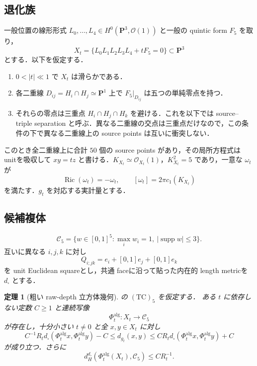 \documentclass[a4paper,11pt]{ltjsarticle}
\numberwithin{equation}{section}
\theoremstyle{plain}
\newtheorem{theorem}{定理}[section]
\theoremstyle{definition}
\theoremstyle{remark}
\newcommand{\PP}{\mathbf P}\newcommand{\CC}{\mathbf C}\newcommand{\RR}{\mathbf R}\newcommand{\ZZ}{\mathbf Z}\newcommand{\NN}{\mathbf N}
\newcommand{\supp}{\operatorname{supp}}\newcommand{\diam}{\operatorname{diam}}\newcommand{\dist}{\operatorname{dist}}
\newcommand{\Ric}{\operatorname{Ric}}\newcommand{\tr}{\operatorname{tr}}\newcommand{\osc}{\operatorname{osc}}\newcommand{\vol}{\operatorname{Vol}}
\newcommand{\Cfive}{\mathcal C_5}\newcommand{\dsq}{d_{\square}}\newcommand{\Lt}{L_t}\newcommand{\Rt}{R_t}
\begin{document}
\subsection{退化族}
一般位置の線形形式 $L_0,\ldots,L_4\in H^0(\PP^3,\mathcal O(1))$ と一般の quintic form $F_5$ を取り，
\begin{equation}\label{coarse:eq:family}
 X_t=\{L_0L_1L_2L_3L_4+tF_5=0\}\subset\PP^3
\end{equation}
とする．以下を仮定する．
\begin{enumerate}[label=\textup{(G\arabic*)}]
\item $0<|t|\ll1$ で $X_t$ は滑らかである．
\item 各二重線 $D_{ij}=H_i\cap H_j\simeq\PP^1$ 上で $F_5|_{D_{ij}}$ は五つの単純零点を持つ．
\item それらの零点は三重点 $H_i\cap H_j\cap H_k$ を避ける．これを以下では source--triple separation と呼ぶ．異なる二重線の交点は三重点だけなので，この条件の下で異なる二重線上の source points は互いに衝突しない．
\end{enumerate}
このとき全二重線上に合計 $50$ 個の source points があり，その局所方程式は unitを吸収して $xy=tz$ と書ける．$K_{X_t}\simeq\mathcal O_{X_t}(1)$，$K_{X_t}^2=5$ であり，一意な $\omega_t$ が
\begin{equation}\label{coarse:eq:KE}
 \Ric(\omega_t)=-\omega_t,
 \qquad [\omega_t]=2\pi c_1(K_{X_t})
\end{equation}
を満たす．$g_t$ を対応する実計量とする．

\subsection{候補複体}
\begin{definition}\label{coarse:def:C5}
\[
 \Cfive=\{w\in[0,1]^5:\max_iw_i=1,\ |\supp w|\le3\}.
\]
互いに異なる $i,j,k$ に対し
\[
 Q_{i;jk}=e_i+[0,1]e_j+[0,1]e_k
\]
を unit Euclidean squareとし，共通 faceに沿って貼った内在的 length metricを $d_\square$ とする．
\end{definition}

\begin{theorem}[粗い raw-depth 立方体幾何]\label{coarse:thm:main}
 の $\mathrm{(TC)}_5$ を仮定する．
ある $t$ に依存しない定数 $C\ge1$ と連続写像
\[
 \Phi_t^{\mathrm{alg}}:X_t\longrightarrow\Cfive
\]
が存在し，十分小さい $t\ne0$ と全 $x,y\in X_t$ に対し
\begin{equation}\label{coarse:eq:coarse-main}
 C^{-1}R_t d_\square(\Phi_t^{\mathrm{alg}}x,\Phi_t^{\mathrm{alg}}y)-C
 \le d_{g_t}(x,y)
 \le CR_t d_\square(\Phi_t^{\mathrm{alg}}x,\Phi_t^{\mathrm{alg}}y)+C
\end{equation}
が成り立つ．さらに
\begin{equation}\label{coarse:eq:image-density-main}
 d_H^{d_\square}(\Phi_t^{\mathrm{alg}}(X_t),\Cfive)\le CR_t^{-1}.
\end{equation}
\end{theorem}
\end{document}
